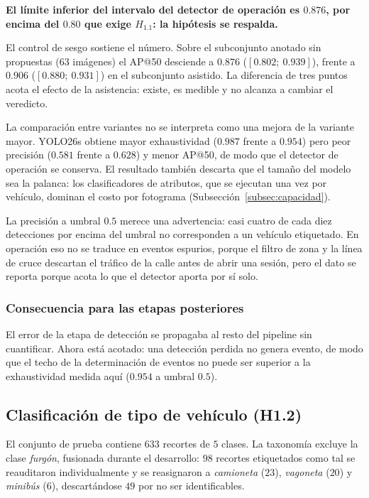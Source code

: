 \textbf{El límite inferior del intervalo del detector de operación es $0{.}876$,
por encima del $0{.}80$ que exige $H_{1{.}1}$: la hipótesis se respalda.}

El control de sesgo sostiene el número. Sobre el subconjunto anotado sin
propuestas ($63$ imágenes) el AP@50 desciende a $0{.}876$
($[0{.}802;\ 0{.}939]$), frente a $0{.}906$ ($[0{.}880;\ 0{.}931]$) en el
subconjunto asistido. La diferencia de tres puntos acota el efecto de la
asistencia: existe, es medible y no alcanza a cambiar el veredicto.

La comparación entre variantes no se interpreta como una mejora de la variante
mayor. YOLO26s obtiene mayor exhaustividad ($0{.}987$ frente a $0{.}954$) pero
peor precisión ($0{.}581$ frente a $0{.}628$) y menor AP@50, de modo que el
detector de operación se conserva. El resultado también descarta que el tamaño del
modelo sea la palanca: los clasificadores de atributos, que se ejecutan una vez por
vehículo, dominan el costo por fotograma (Subsección~\ref{subsec:capacidad}).

La precisión a umbral $0{.}5$ merece una advertencia: casi cuatro de cada diez
detecciones por encima del umbral no corresponden a un vehículo etiquetado. En
operación eso no se traduce en eventos espurios, porque el filtro de zona y la
línea de cruce descartan el tráfico de la calle antes de abrir una sesión, pero el
dato se reporta porque acota lo que el detector aporta por sí solo.

\subsubsection{Consecuencia para las etapas posteriores}

El error de la etapa de detección se propagaba al resto del pipeline sin
cuantificar. Ahora está acotado: una detección perdida no genera evento, de modo
que el techo de la determinación de eventos no puede ser superior a la
exhaustividad medida aquí ($0{.}954$ a umbral $0{.}5$).

\subsection{Clasificación de tipo de vehículo (H1.2)}

El conjunto de prueba contiene $633$ recortes de $5$ clases. La taxonomía excluye
la clase \textit{furgón}, fusionada durante el desarrollo: $98$ recortes
etiquetados como tal se reauditaron individualmente y se reasignaron a
\textit{camioneta} ($23$), \textit{vagoneta} ($20$) y \textit{minibús} ($6$),
descartándose $49$ por no ser identificables.

